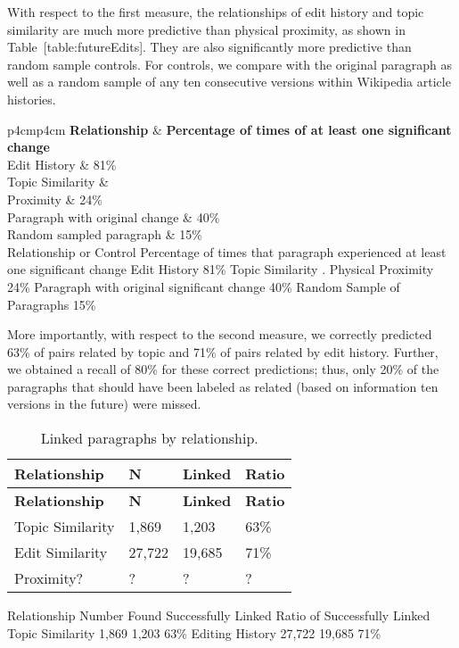 With respect to the first measure, the relationships of edit history and
topic similarity are much more predictive than physical proximity, as
shown in Table~{[}table:futureEdits{]}. They are also significantly more
predictive than random sample controls. For controls, we compare with
the original paragraph as well as a random sample of any ten consecutive
versions within Wikipedia article histories.

{\textbar{}p{4cm}\textbar{}p{4cm}\textbar{}} \textbf{Relationship} \&
\textbf{Percentage of times of at least one significant change}\\Edit
History \& 81\%\\Topic Similarity \&\\

Proximity \& 24\%\\

Paragraph with original change \& 40\%\\

Random sampled paragraph \& 15\%\\

Relationship or Control Percentage of times that paragraph experienced
at least one significant change Edit History 81\% Topic Similarity .
Physical Proximity 24\% Paragraph with original significant change 40\%
Random Sample of Paragraphs 15\%

More importantly, with respect to the second measure, we correctly
predicted 63\% of pairs related by topic and 71\% of pairs related by
edit history. Further, we obtained a recall of 80\% for these correct
predictions; thus, only 20\% of the paragraphs that should have been
labeled as related (based on information ten versions in the future)
were missed.

\begin{longtable}[c]{@{}llll@{}}
\caption{Linked paragraphs by relationship.{}}\tabularnewline
\toprule
\textbf{Relationship} & \textbf{N} & \textbf{Linked} &
\textbf{Ratio}\tabularnewline
\midrule
\endfirsthead
\toprule
\textbf{Relationship} & \textbf{N} & \textbf{Linked} &
\textbf{Ratio}\tabularnewline
\midrule
\endhead
Topic Similarity & 1,869 & 1,203 & 63\%\tabularnewline
Edit Similarity & 27,722 & 19,685 & 71\%\tabularnewline
Proximity? & ? & ? & ?\tabularnewline
\bottomrule
\end{longtable}

Relationship Number Found Successfully Linked Ratio of Successfully
Linked Topic Similarity 1,869 1,203 63\% Editing History 27,722 19,685
71\%

